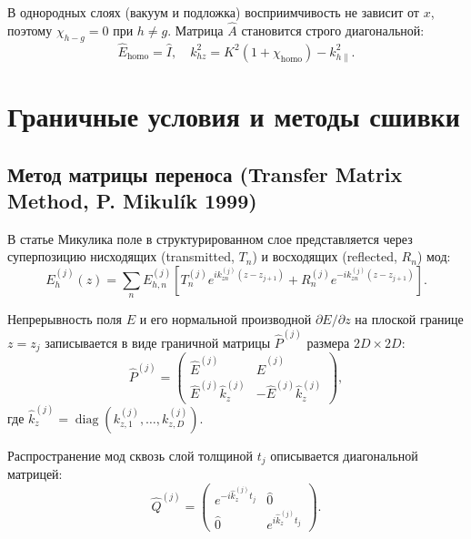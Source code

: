 \documentclass[a4paper,11pt]{article}
\begin{document}
В однородных слоях (вакуум и подложка) восприимчивость не зависит от $x$, поэтому $\chi_{h-g} = 0$ при $h \neq g$. Матрица $\hat{A}$ становится строго диагональной:
\begin{equation}
\hat{E}_{\text{homo}} = \hat{I}, \quad k_{hz}^2 = K^2(1 + \chi_{\text{homo}}) - k_{h\parallel}^2.
\end{equation}

\section{Граничные условия и методы сшивки}

\subsection{Метод матрицы переноса (Transfer Matrix Method, P. Mikulík 1999)}
В статье Микулика поле в структурированном слое представляется через суперпозицию нисходящих (transmitted, $T_n$) и восходящих (reflected, $R_n$) мод:
\begin{equation}
E_h^{(j)}(z) = \sum_{n} E_{h,n}^{(j)} \left[ T_n^{(j)} e^{i k_{zn}^{(j)} (z - z_{j+1})} + R_n^{(j)} e^{-i k_{zn}^{(j)} (z - z_{j+1})} \right].
\end{equation}

Непрерывность поля $E$ и его нормальной производной $\partial E / \partial z$ на плоской границе $z = z_j$ записывается в виде граничной матрицы $\hat{P}^{(j)}$ размера $2D \times 2D$:
\begin{equation}
\hat{P}^{(j)} = \begin{pmatrix} \hat{E}^{(j)} & \hat{E}^{(j)} \\ \hat{E}^{(j)} \hat{k}_z^{(j)} & -\hat{E}^{(j)} \hat{k}_z^{(j)} \end{pmatrix},
\end{equation}
где $\hat{k}_z^{(j)} = \operatorname{diag}(k_{z,1}^{(j)}, \dots, k_{z,D}^{(j)})$.

Распространение мод сквозь слой толщиной $t_j$ описывается диагональной матрицей:
\begin{equation}
\hat{Q}^{(j)} = \begin{pmatrix} e^{-i \hat{k}_z^{(j)} t_j} & \hat{0} \\ \hat{0} & e^{i \hat{k}_z^{(j)} t_j} \end{pmatrix}.
\end{equation}
\end{document}

